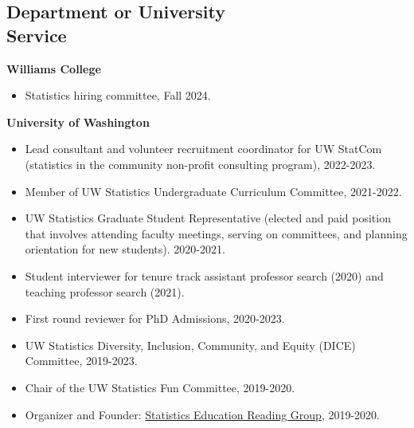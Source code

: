 \documentclass[margin, 10pt]{res}
\begin{document}
\begin{resume}
\section{Department or University \\ Service}
\textbf{Williams College}
\begin{itemize}
\item Statistics hiring committee, Fall 2024. 	
\end{itemize}
\textbf{University of Washington}
\begin{itemize}
\item Lead consultant and volunteer recruitment coordinator for UW StatCom (statistics in the community non-profit consulting program), 2022-2023. 
\item Member of UW Statistics Undergraduate Curriculum Committee, 2021-2022. 
 \item UW Statistics Graduate Student Representative (elected and paid position that involves attending faculty meetings, serving on committees, and planning orientation for new students). 2020-2021.
 \item Student interviewer for tenure track assistant professor search (2020) and teaching professor search (2021). 
\item First round reviewer for PhD Admissions, 2020-2023. 
\item UW Statistics Diversity, Inclusion, Community, and Equity (DICE) Committee, 2019-2023.   
\item Chair of the UW Statistics Fun Committee, 2019-2020.
  \item Organizer and Founder: \href{https://pearce790.github.io/statedrg.html}{Statistics Education Reading Group}, 2019-2020.
 \end{itemize}
 

\end{resume}
\end{document}
